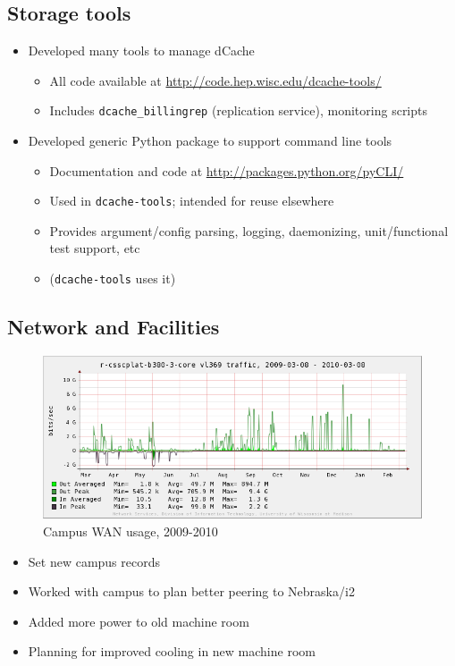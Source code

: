 \documentclass{beamer}
\begin{document}
\subsection{Storage tools}
\begin{frame}
\begin{itemize}
	\item Developed many tools to manage dCache
	\begin{itemize}
		\item All code available at \url{http://code.hep.wisc.edu/dcache-tools/}
		\item Includes {\tt dcache_billingrep} (replication service), monitoring scripts
	\end{itemize}
	\item Developed generic Python package to support command line tools
	\begin{itemize}
		\item Documentation and code at \url{http://packages.python.org/pyCLI/}
		\item Used in {\tt dcache-tools}; intended for reuse elsewhere
		\item Provides argument/config parsing, logging, daemonizing, unit/functional test support, etc
		\item ({\tt dcache-tools} uses it)
	\end{itemize}
\end{itemize}
\end{frame}

\subsection{Network and Facilities}
\begin{frame}
\begin{figure}
	\includegraphics[width=\textwidth]{Graphics/network-1yr.png}
	\caption{Campus WAN usage, 2009-2010}
\end{figure}

\begin{itemize}
	\item Set new campus records
	\item Worked with campus to plan better peering to Nebraska/i2
	\item Added more power to old machine room
	\item Planning for improved cooling in new machine room
\end{itemize}
\end{frame}
\end{document}

